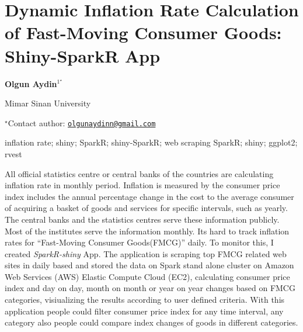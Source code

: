 \documentclass[\main/boa.tex]{subfiles}
\begin{document}
\section{Dynamic Inflation Rate Calculation of Fast-Moving Consumer Goods:
Shiny-SparkR App}

\begin{center}
  {\bf Olgun Aydin$^{1^\star}$}
\end{center}

\vskip 0.3cm

\begin{affiliations}
\begin{enumerate}
\begin{minipage}{0.915\textwidth}
\centering
\item Mimar Sinan University \\[-2pt]
\end{minipage}
\end{enumerate}
$^\star$Contact author: \href{mailto:olgunaydinn@gmail.com}{\nolinkurl{olgunaydinn@gmail.com}}\\
\end{affiliations}

\vskip 0.5cm

\begin{minipage}{0.915\textwidth}
\keywords inflation rate; shiny; SparkR; shiny-SparkR; web scraping
\packages SparkR; shiny; ggplot2; rvest
\end{minipage}

\vskip 0.8cm

All official statistics centre or central banks of the countries are
calculating inflation rate in monthly period. Inflation is measured by
the consumer price index includes the annual percentage change in the
cost to the average consumer of acquiring a basket of goods and services
for specific intervals, such as yearly. The central banks and the
statistics centres serve these information publicly. Most of the
institutes serve the information monthly. Its hard to track inflation
rates for ``Fast-Moving Consumer Goods(FMCG)'' daily. To monitor this, I
created \emph{SparkR-shiny} App. The application is scraping top FMCG
related web sites in daily based and stored the data on Spark stand
alone cluster on Amazon Web Services (AWS) Elastic Compute Cloud (EC2),
calculating consumer price index and day on day, month on month or year
on year changes based on FMCG categories, visiualizing the results
according to user defined criteria. With this application people could
filter consumer price index for any time interval, any category also
people could compare index changes of goods in different categories.
\end{document}
